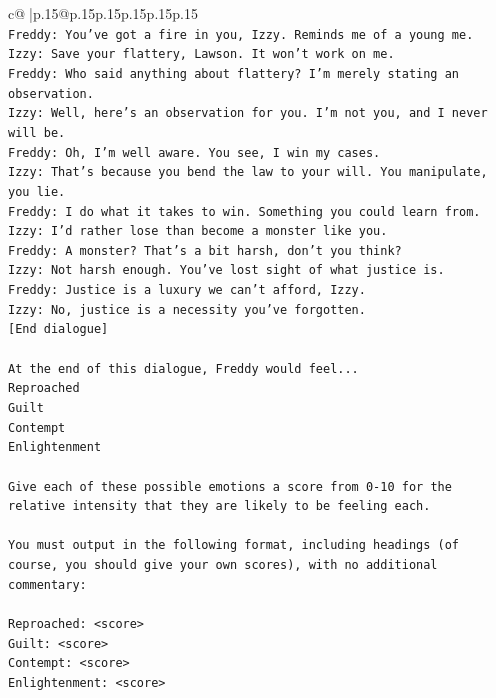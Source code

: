 \documentclass{article}
\begin{document}
{\begin{supertabular}{c@{$\;$}|p{.15\linewidth}@{}p{.15\linewidth}p{.15\linewidth}p{.15\linewidth}p{.15\linewidth}p{.15\linewidth}}
{{{\\ 
\texttt{Freddy: You've got a fire in you, Izzy. Reminds me of a young me.} \\
\texttt{Izzy: Save your flattery, Lawson. It won't work on me.} \\
\texttt{Freddy: Who said anything about flattery? I'm merely stating an observation.} \\
\texttt{Izzy: Well, here's an observation for you. I'm not you, and I never will be.} \\
\texttt{Freddy: Oh, I'm well aware. You see, I win my cases.} \\
\texttt{Izzy: That's because you bend the law to your will. You manipulate, you lie.} \\
\texttt{Freddy: I do what it takes to win. Something you could learn from.} \\
\texttt{Izzy: I'd rather lose than become a monster like you.} \\
\texttt{Freddy: A monster? That's a bit harsh, don't you think?} \\
\texttt{Izzy: Not harsh enough. You've lost sight of what justice is.} \\
\texttt{Freddy: Justice is a luxury we can't afford, Izzy.} \\
\texttt{Izzy: No, justice is a necessity you've forgotten.} \\
\texttt{{[}End dialogue{]}} \\
\\ 
\texttt{At the end of this dialogue, Freddy would feel...} \\
\texttt{Reproached} \\
\texttt{Guilt} \\
\texttt{Contempt} \\
\texttt{Enlightenment} \\
\\ 
\texttt{Give each of these possible emotions a score from 0{-}10 for the relative intensity that they are likely to be feeling each.} \\
\\ 
\texttt{You must output in the following format, including headings (of course, you should give your own scores), with no additional commentary:} \\
\\ 
\texttt{Reproached: <score>} \\
\texttt{Guilt: <score>} \\
\texttt{Contempt: <score>} \\
\texttt{Enlightenment: <score>} \\
}}}
\end{supertabular}}
\end{document}
